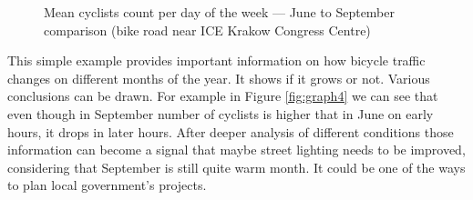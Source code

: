 \begin{figure}[H]
    \centering
    \caption{Mean cyclists count per day of the week --- June to September comparison (bike road near ICE Krakow Congress Centre)}
    \label{fig:graph7}
\end{figure}
This simple example provides important information on how bicycle traffic changes on different months of the year. It shows if it grows or not. Various conclusions can be drawn. For example in Figure \ref{fig:graph4} we can see that even though in September number of cyclists is higher that in June on early hours, it drops in later hours. After deeper analysis of different conditions those information can become a signal that maybe street lighting needs to be improved, considering that September is still quite warm month. It could be one of the ways to plan local government's projects.

